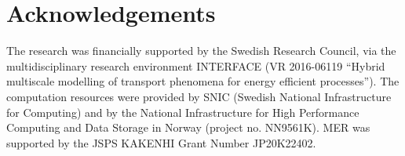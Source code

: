 \documentclass[review]{elsarticle}
\begin{document}
\section*{Acknowledgements}
The research was financially supported by the Swedish Research Council, via the multidisciplinary research environment INTERFACE (VR  2016-06119 ``Hybrid multiscale modelling of transport phenomena for energy efficient processes''). The computation resources were provided by SNIC (Swedish National Infrastructure for Computing) and by the National Infrastructure for High Performance Computing and Data Storage in Norway (project no. NN9561K). MER was supported by the JSPS KAKENHI Grant Number JP20K22402.
 

\end{document}
